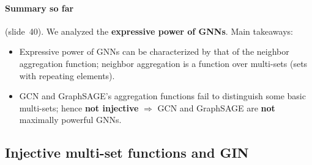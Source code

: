 \paragraph{Summary so far} (slide~40). We analyzed the \textbf{expressive power
of GNNs}. Main takeaways:
\begin{itemize}
  \item Expressive power of GNNs can be characterized by that of the neighbor
    aggregation function; neighbor aggregation is a function over multi-sets
    (sets with repeating elements).
  \item GCN and GraphSAGE's aggregation functions fail to distinguish some basic
    multi-sets; hence \textbf{not injective} $\Rightarrow$ GCN and GraphSAGE are
    \textbf{not} maximally powerful GNNs.
\end{itemize}

\subsection{Injective multi-set functions and GIN}\label{sec:lec06-gin}

